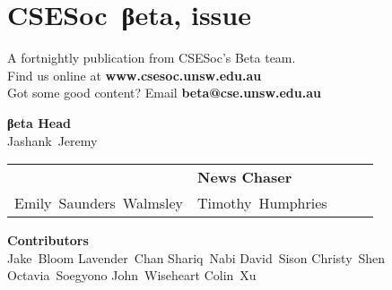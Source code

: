 \documentclass[twoside]{article}
\date{29 July 2015}
\makeatletter
\gdef\the@issue{108}
\makeatother
\begin{document}

\newpage
\maketitle\thispagestyle{mag}
\vspace*{-2em}\section*{CSE{}Soc~βeta, issue \makeatletter\the@issue}
\begin{multicols}{2}\begingroup\raggedcolumns
\begin{center}
A fortnightly publication from CSESoc's Beta team.\\
Find us online at \textbf{www.csesoc.unsw.edu.au}\\
Got some good content? Email \textbf{beta@cse.unsw.edu.au}\\
\par{\bf\sffamily βeta Head}\\ Jashank~Jeremy
\par\begin{tabular}{>{\raggedleft}p{0.5\linewidth}>{\raggedright}p{0.5\linewidth}}
{\bf\sffamily Puzzle Wrangler} & {\bf\sffamily News Chaser}\tabularnewline
Emily~Saunders~Walmsley & Timothy~Humphries\tabularnewline
\end{tabular}
\par{\bf\sffamily Contributors}\\
  Jake~Bloom\hsp{}
  Lavender~Chan\hsp{}
  Shariq~Nabi\hsp{}
  David~Sison\hsp{}
  Christy~Shen\hsp{}
  Octavia~Soegyono\hsp{}
  John~Wiseheart\hsp{}
  Colin~Xu\hsp{}
\end{center}
\columnbreak\malcontents\vfill\endgroup
\end{multicols}\LRmulticolcolumns
\vspace*{-4em}\begin{multicols}{2}


\end{multicols}
\end{document}
